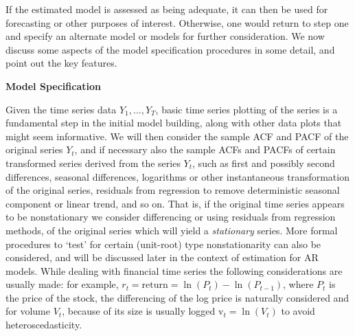If the estimated model is assessed as being adequate, it can then be used for forecasting or other purposes of interest. Otherwise, one would return to step one and specify an alternate model or models for further consideration. We now discuss some aspects of the model specification procedures in some detail, and point out the key features. \twomedskip


\noindent\textbf{Model Specification} \twomedskip


Given the time series data $Y_1, \ldots, Y_T$, basic time series  plotting of the series is a fundamental step in the initial model building, along with other data plots that might seem informative. We will then consider the sample ACF and PACF of the original series $Y_t$, and if necessary also the sample ACFs and PACFs of certain transformed series derived from the series $Y_t$, such as first and possibly second differences, seasonal differences, logarithms or other instantaneous transformation of the original series, residuals from regression to remove deterministic seasonal component or linear trend, and so on. That is, if the original time series appears to be nonstationary we consider differencing or using residuals from regression methods, of the original series which will yield a \emph{stationary} series. More formal procedures to `test' for certain (unit-root) type nonstationarity can also be considered, and will be discussed later in the context of estimation for AR models.  While dealing with financial time series the following considerations are usually made: for example, $r_t= \text{return} = \ln(P_t) - \ln(P_{t-1})$, where $P_t$ is the price of the stock, the differencing of the log price is naturally considered and for volume $V_t$, because of its size is usually logged $\text{v}_t= \ln(V_t)$ to avoid heteroscedasticity.


